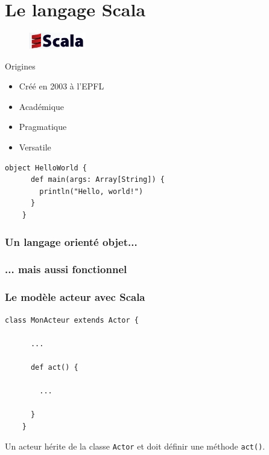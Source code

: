 \documentclass{beamer}
\begin{document}
\section{Le langage Scala}

\begin{frame}[containsverbatim]

  \begin{figure}
    \centering
    \includegraphics[width=2.5cm]{scala.png}
  \end{figure}

  \vfill

  \begin{block}{Origines}
    \begin{itemize}
    \item{Créé en 2003 à l'EPFL}
    \item{Académique}
    \item{Pragmatique}
    \item{Versatile}
    \end{itemize}
  \end{block}

  \vfill

  \begin{lstlisting}[frame=single]
    object HelloWorld {
      def main(args: Array[String]) {
        println("Hello, world!")
      }
    }
  \end{lstlisting}

\end{frame}

\begin{frame}[containsverbatim]

  \frametitle{Un langage orienté objet...}

  

\end{frame}

\begin{frame}[containsverbatim]

  \frametitle{... mais aussi fonctionnel}

  

\end{frame}

\begin{frame}[containsverbatim]

  \frametitle{Le modèle acteur avec Scala}

  \begin{lstlisting}[frame=single]
    class MonActeur extends Actor {

      ...

      def act() {

        ...

      }
    }
  \end{lstlisting}

  \vfill

  Un acteur hérite de la classe \texttt{Actor} et doit définir une méthode \texttt{act()}.

\end{frame}
\end{document}
